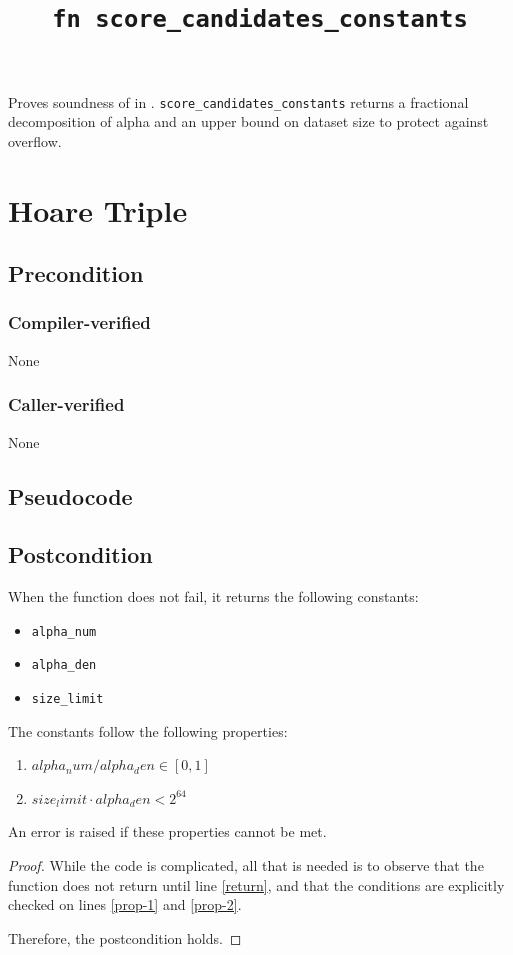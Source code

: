 \documentclass{article}
\title{\texttt{fn score\_candidates\_constants}}
\author{\MichaelShoemateAuthor}
\begin{document}
\maketitle


\contrib

Proves soundness of 
in .
\texttt{score\_candidates\_constants} returns a fractional decomposition of alpha and an upper bound on dataset size to protect against overflow.

\section{Hoare Triple}
\subsection*{Precondition}
\subsubsection*{Compiler-verified}
None

\subsubsection*{Caller-verified}
None

\subsection*{Pseudocode}
\label{sec:python-pseudocode}



\subsection*{Postcondition}

\begin{theorem}
    When the function does not fail, it returns the following constants:
    \begin{itemize}
        \item \texttt{alpha\_num}
        \item \texttt{alpha\_den}
        \item \texttt{size\_limit}
    \end{itemize}

    The constants follow the following properties:
    \begin{enumerate}
        \item $alpha_num / alpha_den \in [0, 1]$
        \item $size_limit \cdot alpha_den < 2^{64}$
    \end{enumerate}

    An error is raised if these properties cannot be met.
\end{theorem}

\begin{proof}
    While the code is complicated, all that is needed is to observe that the function does not return until line \ref{return},
    and that the conditions are explicitly checked on lines \ref{prop-1} and \ref{prop-2}.

    Therefore, the postcondition holds.
\end{proof}
\end{document}
